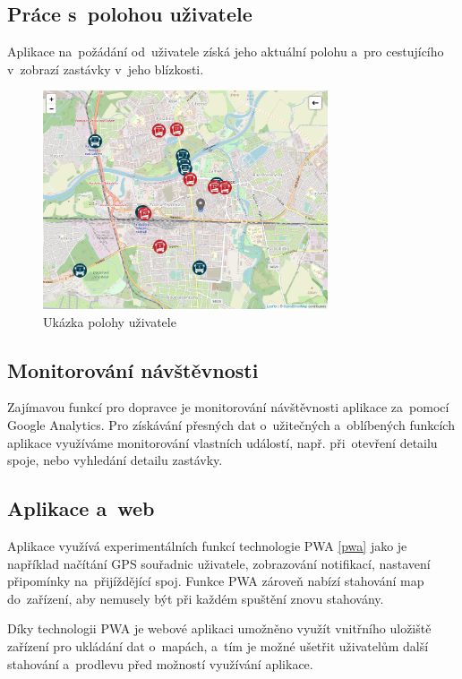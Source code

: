 \subsection{Práce s~polohou uživatele}
Aplikace na~požádání od~uživatele získá jeho aktuální polohu a~pro cestujícího v~zobrazí zastávky v~jeho blízkosti.

\begin{figure}[H]
    \centering
    \includegraphics[width=0.75\textwidth]{images/position.png}
    \caption{Ukázka polohy uživatele}
    \label{poloha}
\end{figure}
\newpage
\subsection{Monitorování návštěvnosti}
Zajímavou funkcí pro dopravce je monitorování návštěvnosti aplikace za~pomocí Google Analytics. Pro získávání přesných dat o~užitečných a~oblíbených funkcích aplikace využíváme monitorování vlastních událostí, např. při~otevření detailu spoje, nebo vyhledání detailu zastávky.
\subsection{Aplikace a~web}
Aplikace využívá experimentálních funkcí technologie PWA \ref{pwa} jako je například načítání GPS souřadnic uživatele, zobrazování notifikací, nastavení připomínky na~přijíždějící spoj. Funkce PWA zároveň nabízí stahování map do~zařízení, aby nemusely být při každém spuštění znovu stahovány.

Díky technologii PWA je webové aplikaci umožněno využít vnitřního uložiště zařízení pro ukládání dat o~mapách, a~tím je možné ušetřit uživatelům další stahování a~prodlevu před možností využívání aplikace.
